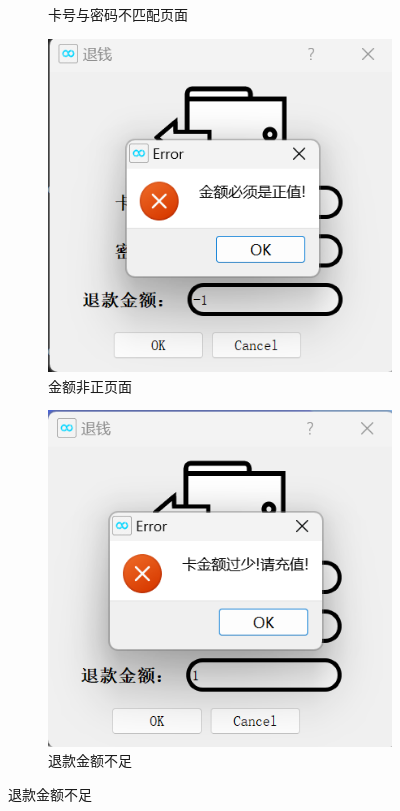 \documentclass{article}
\begin{document}
\begin{figure}[htbp]
\begin{subfigure}{0.24\linewidth}
            \caption{卡号与密码不匹配页面}
            \label{refund_id_password_error}
        \end{subfigure}
        \centering
        \begin{subfigure}{0.24\linewidth}
            \centering
            \includegraphics[width=\linewidth]{figure/refund_less_zero.png}
            \caption{金额非正页面}
            \label{refund_less_zero}
        \end{subfigure}
        \centering
        \begin{subfigure}{0.24\linewidth}
            \centering
            \includegraphics[width=\linewidth]{figure/refund_less_money.png}
            \caption{退款金额不足}
            \label{refund_less_money}
        \end{subfigure}
    \end{figure}
\end{document}
